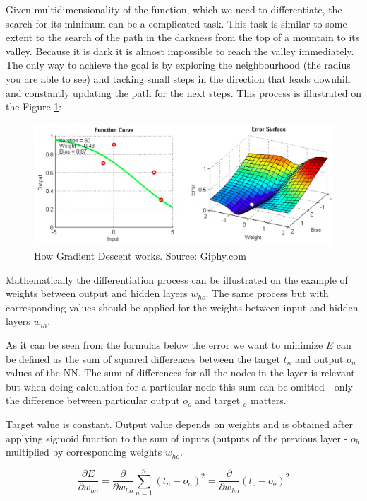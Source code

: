 Given multidimensionality of the function, which we need to differentiate, the search for its minimum can be a complicated task. This task is similar to some extent to the search of the path in the darkness from the top of a mountain to its valley. Because it is dark it is almost impossible to reach the valley immediately. The only way to achieve the goal is by exploring the neighbourhood (the radius you are able to see) and tacking small steps in the direction that leads downhill and constantly updating the path for the next steps. This process is illustrated on the Figure \ref{fig:gradient-descent}:

\begin{figure}[H]
    \includegraphics[width=\linewidth]{pics/gradient_descent.png}
    \caption{\label{fig:gradient-descent} How Gradient Descent works. Source: Giphy.com}
\end{figure}

Mathematically the differentiation process can be illustrated on the example of weights between output and hidden layers \(w_{ho}\). The same process but with corresponding values should be applied for the weights between input and hidden layers \(w_{ih}\).

As it can be seen from the formulas below the error we want to minimize \(E\) can be defined as the sum of squared differences between the target \(t_n\) and output \(o_n\) values of the NN. The sum of differences for all the nodes in the layer is relevant but when doing calculation for a particular node this sum can be omitted - only the difference between particular output \(o_o\) and target \(_o\) matters.

Target value is constant. Output value depends on weights and is obtained after applying sigmoid function to the sum of inputs (outputs of the previous layer - \(o_h\) multiplied by corresponding weights \(w_{ho}\).

\begin{equation}
\frac{\partial E}{\partial w_{ho}}=\frac{\partial}{\partial w_{ho}}\displaystyle\sum_{n=1}^{n} (t_n-o_n)^2=\frac{\partial}{\partial w_{ho}}(t_o-o_o)^2
\end{equation}

